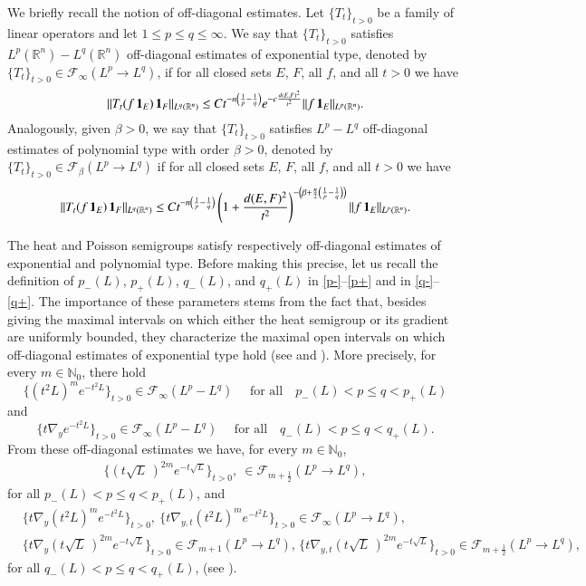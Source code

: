 \documentclass[11pt, a4paper,leqno]{amsart}
\renewcommand{\chi}{{\bf 1}}
\theoremstyle{plain}
\theoremstyle{definition}
\theoremstyle{remark}
\numberwithin{equation}{section}
\def \R{ \mathbb{R} }
\def \N{ \mathbb{N} }
\begin{document}
We briefly recall the notion of off-diagonal estimates. Let $\{T_t\}_{t>0}$ be a family of linear operators
and let $1\le p\leq q\le \infty$. We say that $\{T_t\}_{t>0}$ satisfies $L^p(\R^n)-L^q(\R^n)$ off-diagonal estimates of exponential type, denoted by $\{T_t\}_{t>0}\in \mathcal{F}_\infty(L^p\rightarrow L^q)$, if for all closed sets $E$, $F$, all $f$, and all $t>0$ we have
$$
\|T_{t}(f\,\chi_E)\,\chi_F\|_{L^q(\mathbb{R}^n)}
\leq
Ct^{-n\left(\frac{1}{p}-\frac{1}{q}\right)}e^{-c\frac{d(E,F)^2}{t^2}}\|f\,\chi_E\|_{L^p(\mathbb{R}^n)}.
$$
Analogously, given $\beta>0$, we say that $\{T_t\}_{t>0}$ satisfies $L^p-L^q$ off-diagonal estimates of polynomial type with order $\beta>0$, denoted by $\{T_t\}_{t>0}\in \mathcal{F}_{\beta}(L^p\rightarrow L^q)$ if for all closed sets $E$, $F$, all $f$, and all $t>0$ we have
$$
\|T_{t}(f\,\chi_E)\,\chi_F\|_{L^q(\mathbb{R}^n)}
\leq
Ct^{-n\left(\frac{1}{p}-\frac{1}{q}\right)}\left(1+\frac{d(E,F)^2}{t^2}
    \right)^{-\left(\beta+\frac{n}{2}\left(\frac{1}{p}-\frac{1}{q}\right)\right)}
\|f\,\chi_E\|_{L^p(\mathbb{R}^n)}.
$$






\medskip

The heat and Poisson semigroups satisfy respectively off-diagonal estimates of exponential and polynomial type. Before making this precise, let us recall the definition of $p_-(L)$, $p_+(L)$, $q_-(L)$, and $q_+(L)$ in \eqref{p-}--\eqref{p+} and in \eqref{q-}--\eqref{q+}.
The importance of these parameters stems from the fact that, besides giving the maximal intervals on which either the heat semigroup or its gradient are uniformly bounded, they characterize the maximal open intervals on which off-diagonal estimates of exponential type hold (see \cite{Auscher} and \cite{AuscherMartell:II}). More precisely, for every $m\in \N_0$, there hold
$$
\{(t^2L)^me^{-t^2L}\}_{t>0}\in \mathcal{F}_\infty(L^p-L^q) \quad \textrm{ for all} \quad p_-(L)<p\leq q<p_+(L)$$
and
$$
\{t\nabla_ye^{-t^2L}\}_{t>0}\in \mathcal{F}_\infty(L^p-L^q) \quad \textrm{ for all} \quad q_-(L)<p\leq q<q_+(L).
$$
From these off-diagonal estimates we have, for every $m\in \N_0$,
\begin{align*}
\{(t\sqrt{L}\,)^{2m}e^{-t\sqrt{L}}\}_{t>0}, \
\in \mathcal{F}_{m+\frac{1}{2}}(L^p\rightarrow L^q),
\end{align*}
for all $p_-(L)<p\leq q< p_+(L)$, and
\begin{align*}
 &\{t\nabla_{y}(t^2L)^me^{-t^2L}\}_{t>0}, \ \{t\nabla_{y,t}(t^2L)^me^{-t^2L}\}_{t>0}\in \mathcal{F}_\infty(L^p\rightarrow L^q),
\\[4pt]
&  \{t\nabla_{y}(t\sqrt{L}\,)^{2m}e^{-t\sqrt{L}}\}_{t>0}\in \mathcal{F}_{m+1}(L^p\rightarrow L^q), \,
\{t\nabla_{y,t}(t\sqrt{L}\,)^{2m}e^{-t\sqrt{L}}\}_{t>0}\in \mathcal{F}_{m+\frac{1}{2}}(L^p\rightarrow L^q),
\end{align*}
for all $q_-(L)<p\leq q< q_+(L)$, (see \cite[Section 2]{MartellPrisuelos}).
\end{document}
